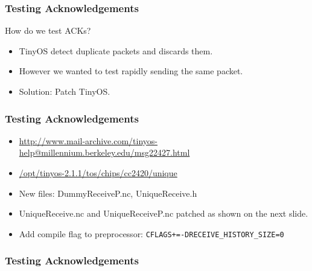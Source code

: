 
\begin{frame}
\frametitle{Testing Acknowledgements}
How do we test ACKs?

\begin{itemize}
\item TinyOS detect duplicate packets and discards them. 
\item However we wanted to test rapidly sending the same packet.
\item Solution: Patch TinyOS.
\end{itemize}

\end{frame}

\begin{frame}
\frametitle{Testing Acknowledgements}
\begin{itemize}
\item \url{http://www.mail-archive.com/tinyos-help@millennium.berkeley.edu/msg22427.html}
\item \url{/opt/tinyos-2.1.1/tos/chips/cc2420/unique}
\item New files: DummyReceiveP.nc, UniqueReceive.h
\item UniqueReceive.nc and UniqueReceiveP.nc patched as shown on the next slide.
\item Add compile flag to preprocessor: \texttt{CFLAGS+=-DRECEIVE\_HISTORY\_SIZE=0}
\end{itemize}
\end{frame}

\begin{frame}
\frametitle{Testing Acknowledgements}



\end{frame}


